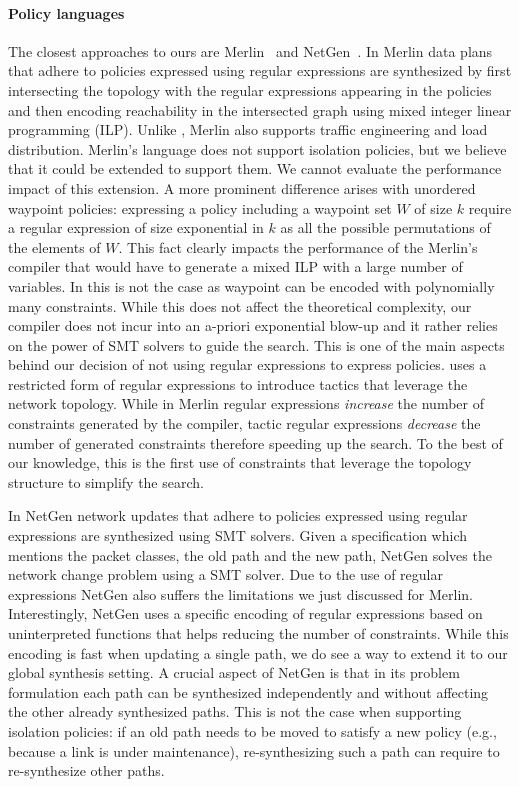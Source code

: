 \paragraph{Policy languages}
The closest approaches to ours are Merlin~\cite{merlin} and NetGen~\cite{netgen}.
In Merlin data plans that adhere to policies expressed using regular expressions are synthesized
by first intersecting the topology with the regular expressions appearing in the policies and then encoding reachability in the
intersected graph using mixed integer linear programming (ILP). 
Unlike \Name, Merlin also supports traffic engineering and load distribution.
Merlin's language does not support isolation policies, but we believe that it could be extended to support them. 
We cannot evaluate the performance impact of this extension.
A more prominent difference arises with unordered waypoint policies:
expressing a policy including a waypoint set $W$ of size $k$ require a regular expression of size exponential
in $k$ as all the possible permutations of the elements of $W$. This fact clearly impacts the performance of the Merlin's
compiler that would have to generate a mixed ILP with a large number of variables.
In \Name this is not the case as waypoint can be encoded with polynomially many constraints.
While this does not affect the theoretical complexity, our compiler does not incur into an a-priori exponential
blow-up and it rather relies on the power of SMT solvers to guide the search.
This is one of the main aspects behind our decision of not using regular expressions to express policies.
\Name uses a restricted form of regular expressions to introduce tactics that leverage the network topology.
While in Merlin regular expressions \emph{increase} the number of constraints generated by the compiler, tactic regular expressions
\emph{decrease} the number of generated constraints therefore speeding up the search.
To the best of our knowledge, this is the first use of constraints that leverage the topology structure to simplify the search.

In NetGen network updates that adhere to policies expressed using regular expressions are synthesized using SMT solvers. 
Given a specification which mentions the packet classes, the old path and the new path, NetGen solves the network change problem using a SMT solver. 
Due to the use of regular expressions NetGen also suffers the limitations we just discussed for Merlin.
Interestingly, NetGen uses a specific encoding of regular expressions based on uninterpreted functions that helps 
reducing the number of constraints. While this encoding is fast when updating a single path, we do see a way
to extend it to our global synthesis setting.
A crucial aspect of NetGen is that in its problem formulation each path can be synthesized independently and without affecting the
other already synthesized paths.
This is not the case when supporting isolation policies: if an old path needs to be moved to satisfy a new policy (e.g., because a link is under
maintenance), re-synthesizing such a path can require to re-synthesize other paths.


